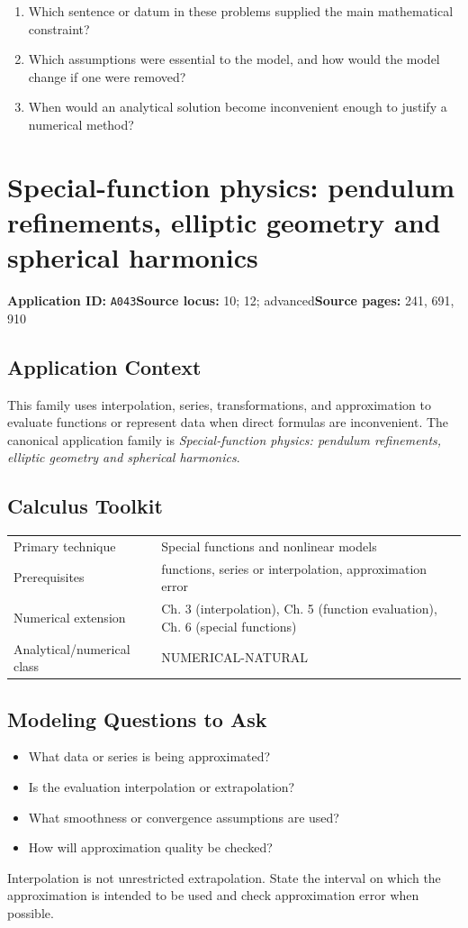 \documentclass[11pt]{book}
\newcommand{\pid}[1]{\texttt{#1}}
\begin{document}
\begin{reflectionbox}\begin{enumerate}
\item Which sentence or datum in these problems supplied the main mathematical constraint?
\item Which assumptions were essential to the model, and how would the model change if one were removed?
\item When would an analytical solution become inconvenient enough to justify a numerical method?
\end{enumerate}\end{reflectionbox}
\chapter{Special-function physics: pendulum refinements, elliptic geometry and spherical harmonics}\label{app:A043}
\textbf{Application ID:} \pid{A043}\quad \textbf{Source locus:} 10; 12; advanced\quad \textbf{Source pages:} 241, 691, 910
\section*{Application Context}
This family uses interpolation, series, transformations, and approximation to evaluate functions or represent data when direct formulas are inconvenient. The canonical application family is \emph{Special-function physics: pendulum refinements, elliptic geometry and spherical harmonics}.
\section*{Calculus Toolkit}
\begin{tabularx}{\textwidth}{@{}lX@{}}\toprule
Primary technique & Special functions and nonlinear models \\
Prerequisites & functions, series or interpolation, approximation error \\
Numerical extension & Ch. 3 (interpolation), Ch. 5 (function evaluation), Ch. 6 (special functions) \\
Analytical/numerical class & NUMERICAL-NATURAL \\
\bottomrule\end{tabularx}
\section*{Modeling Questions to Ask}\begin{itemize}
\item What data or series is being approximated?
\item Is the evaluation interpolation or extrapolation?
\item What smoothness or convergence assumptions are used?
\item How will approximation quality be checked?
\end{itemize}
\begin{errorbox}Interpolation is not unrestricted extrapolation. State the interval on which the approximation is intended to be used and check approximation error when possible.\end{errorbox}
\end{document}
